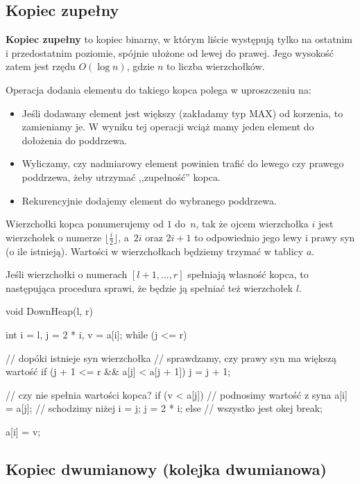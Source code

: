 \subsection{Kopiec zupełny}

\textbf{Kopiec zupełny} to kopiec binarny, w którym liście występują tylko na ostatnim i przedostatnim poziomie, spójnie ułożone od lewej do prawej. Jego wysokość zatem jest rzędu $O(\log n)$, gdzie $n$ to liczba wierzchołków.

Operacja dodania elementu do takiego kopca polega w uproszczeniu na:
\begin{itemize}
    \item Jeśli dodawany element jest większy (zakładamy typ MAX) od korzenia, to zamieniamy je. W wyniku tej operacji wciąż mamy jeden element do dołożenia do poddrzewa. 
    \item Wyliczamy, czy nadmiarowy element powinien trafić do lewego czy prawego poddrzewa, żeby utrzymać ,,zupełność'' kopca.
    \item Rekurencyjnie dodajemy element do wybranego poddrzewa.
\end{itemize}

Wierzchołki kopca ponumerujemy od $1$ do~$n$, tak że ojcem wierzchołka $i$ jest wierzchołek o numerze $\lfloor \frac{i}{2} \rfloor$, a~$2i$ oraz $2i + 1$ to odpowiednio jego lewy i prawy syn (o ile istnieją). Wartości w wierzchołkach będziemy trzymać w tablicy $a$.

Jeśli wierzchołki o numerach $[l + 1, \dots, r]$ spełniają własność kopca,
to następująca procedura sprawi, że będzie ją spełniać też wierzchołek $l$.
\begin{cpp}
    void DownHeap(l, r) {
        int i = l, j = 2 * i, v = a[i];
        while (j <= r) { // dopóki istnieje syn wierzchołka
            // sprawdzamy, czy prawy syn ma większą wartość
            if (j + 1 <= r && a[j] < a[j + 1])
               j = j + 1; 
    
            // czy nie spełnia wartości kopca?
            if (v < a[j]) {
                // podnosimy wartość z syna 
                a[i] = a[j]; 
                // schodzimy niżej
                i = j;
                j = 2 * i;
            } else {
                // wszystko jest okej
                break;
            }
        }
        a[i] = v;
    }
\end{cpp}

\subsection{Kopiec dwumianowy (kolejka dwumianowa)}

